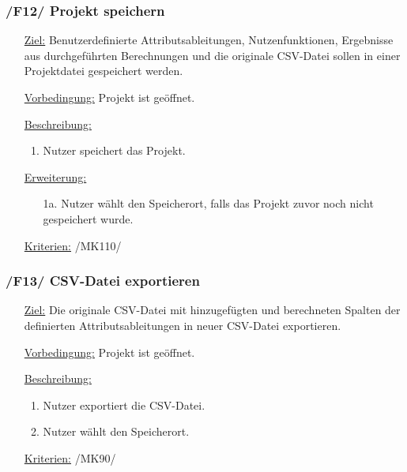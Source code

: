 \documentclass{article}
\begin{document}
\subsubsection*{\textbf{/F12/} Projekt speichern} \label{sec:f:Projekt speichern}
\begin{itemize}
    \item[\underline{Ziel:}] Benutzerdefinierte Attributsableitungen, Nutzenfunktionen, Ergebnisse aus durchgeführten Berechnungen und die originale CSV-Datei sollen in einer Projektdatei gespeichert werden.
    \item[\underline{Vorbedingung:}] Projekt ist geöffnet.
    \item[\underline{Beschreibung:}] 
    \begin{enumerate}
        \item Nutzer speichert das Projekt.
    \end{enumerate}
    \item[\underline{Erweiterung:}]
    \begin{itemize}
        \item[1a.] Nutzer wählt den Speicherort, falls das Projekt zuvor noch nicht gespeichert wurde.
    \end{itemize}
    \item[\underline{Kriterien:}] /MK110/
\end{itemize}

\subsubsection*{\textbf{/F13/} CSV-Datei exportieren} \label{sec:f:CSV-Datei exportieren}
\begin{itemize}
    \item[\underline{Ziel:}] Die originale CSV-Datei mit hinzugefügten und berechneten Spalten der definierten Attributsableitungen in neuer CSV-Datei exportieren.
    \item[\underline{Vorbedingung:}] Projekt ist geöffnet.
    \item[\underline{Beschreibung:}] 
    \begin{enumerate}
        \item Nutzer exportiert die CSV-Datei.
        \item Nutzer wählt den Speicherort.
    \end{enumerate}
    \item[\underline{Kriterien:}] /MK90/
\end{itemize}
\end{document}
